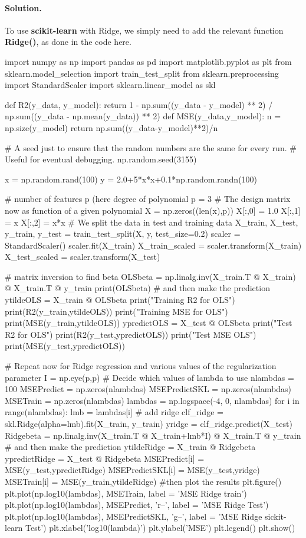 \documentclass[%
oneside,                 %
final,                   %
10pt]{article}
\newenvironment{doconceexercise}{}{}
\begin{document}
\begin{doconceexercise}
\paragraph{Solution.}
To use \textbf{scikit-learn} with Ridge, we simply need to add the relevant function \textbf{Ridge()}, as done in the code here.
\begin{print}
import numpy as np
import pandas as pd
import matplotlib.pyplot as plt
from sklearn.model_selection import train_test_split
from sklearn.preprocessing import StandardScaler
import sklearn.linear_model as skl

def R2(y_data, y_model):
    return 1 - np.sum((y_data - y_model) ** 2) / np.sum((y_data - np.mean(y_data)) ** 2)
def MSE(y_data,y_model):
    n = np.size(y_model)
    return np.sum((y_data-y_model)**2)/n


# A seed just to ensure that the random numbers are the same for every run.
# Useful for eventual debugging.
np.random.seed(3155)

x = np.random.rand(100)
y = 2.0+5*x*x+0.1*np.random.randn(100)

# number of features p (here degree of polynomial
p = 3
#  The design matrix now as function of a given polynomial
X = np.zeros((len(x),p))
X[:,0] = 1.0
X[:,1] = x
X[:,2] = x*x
# We split the data in test and training data
X_train, X_test, y_train, y_test = train_test_split(X, y, test_size=0.2)
scaler = StandardScaler()
scaler.fit(X_train)
X_train_scaled = scaler.transform(X_train)
X_test_scaled = scaler.transform(X_test)

# matrix inversion to find beta
OLSbeta = np.linalg.inv(X_train.T @ X_train) @ X_train.T @ y_train
print(OLSbeta)
# and then make the prediction
ytildeOLS = X_train @ OLSbeta
print("Training R2 for OLS")
print(R2(y_train,ytildeOLS))
print("Training MSE for OLS")
print(MSE(y_train,ytildeOLS))
ypredictOLS = X_test @ OLSbeta
print("Test R2 for OLS")
print(R2(y_test,ypredictOLS))
print("Test MSE OLS")
print(MSE(y_test,ypredictOLS))

# Repeat now for Ridge regression and various values of the regularization parameter
I = np.eye(p,p)
# Decide which values of lambda to use
nlambdas = 100
MSEPredict = np.zeros(nlambdas)
MSEPredictSKL = np.zeros(nlambdas)
MSETrain = np.zeros(nlambdas)
lambdas = np.logspace(-4, 0, nlambdas)
for i in range(nlambdas):
    lmb = lambdas[i]
    # add ridge
    clf_ridge = skl.Ridge(alpha=lmb).fit(X_train, y_train)
    yridge = clf_ridge.predict(X_test)
    Ridgebeta = np.linalg.inv(X_train.T @ X_train+lmb*I) @ X_train.T @ y_train
    # and then make the prediction
    ytildeRidge = X_train @ Ridgebeta
    ypredictRidge = X_test @ Ridgebeta
    MSEPredict[i] = MSE(y_test,ypredictRidge)
    MSEPredictSKL[i] = MSE(y_test,yridge)
    MSETrain[i] = MSE(y_train,ytildeRidge)
#then plot the results
plt.figure()
plt.plot(np.log10(lambdas), MSETrain, label = 'MSE Ridge train')
plt.plot(np.log10(lambdas), MSEPredict, 'r--', label = 'MSE Ridge Test')
plt.plot(np.log10(lambdas), MSEPredictSKL, 'g--', label = 'MSE Ridge sickit-learn Test')
plt.xlabel('log10(lambda)')
plt.ylabel('MSE')
plt.legend()
plt.show()
\end{print}


\end{doconceexercise}
\end{document}
